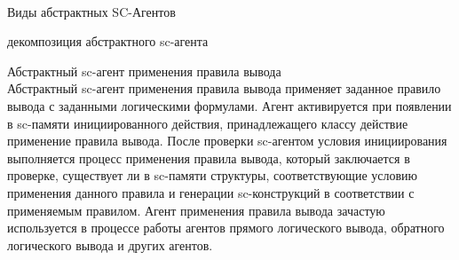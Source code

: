 \begin{frame}{\\Виды абстрактных SC-Агентов} 
\topline
    \begin{SCn}
\begin{scnrelfromset}{декомпозиция абстрактного sc-агента}
\end{scnrelfromset}
\begin{scnindent}
\end{scnindent}
\end{SCn}
\end{frame}

\begin{frame}{Абстрактный sc-агент применения правила вывода}
\topline
\vspace{8mm}
 \\

  Абстрактный sc-агент применения правила вывода применяет заданное правило вывода с заданными логическими формулами. Агент активируется при появлении в sc-памяти инициированного действия, принадлежащего классу действие применение правила вывода. После проверки sc-агентом условия инициирования выполняется процесс применения правила вывода, который заключается в проверке, существует ли в sc-памяти структуры, соответствующие условию применения данного правила и генерации sc-конструкций в соответствии с применяемым правилом. Агент применения правила вывода зачастую используется в процессе работы агентов прямого логического вывода, обратного логического вывода и других агентов.  
\end{frame}


